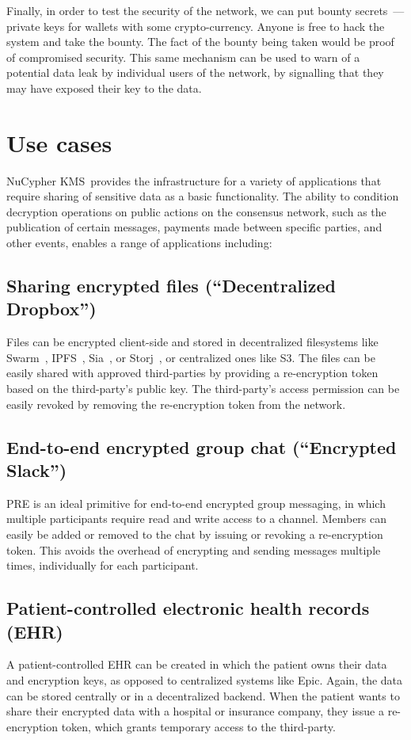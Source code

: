 \documentclass[longbibliography,nofootinbib]{revtex4-1}
\newcommand{\kms}{NuCypher KMS}
\begin{document}
Finally, in order to test the security of the network, we can put bounty secrets~--- private keys for wallets with
some crypto-currency.
Anyone is free to hack the system and take the bounty.
The fact of the bounty being taken would be proof of compromised security.
This same mechanism can be used to warn of a potential data leak by individual users of the network, by signalling that they may have exposed
their key to the data.

\section{Use cases}
\kms~provides the infrastructure for a variety of applications that require sharing of sensitive data as a basic
functionality. The ability to condition decryption operations on public actions on the consensus network, such as the publication
of certain messages, payments made between specific parties, and other events, enables a range of applications including:

\subsection{Sharing encrypted files (``Decentralized Dropbox'')}
\label{sec:files}
Files can be encrypted client-side and stored in decentralized filesystems like Swarm~\cite{swarm}, IPFS~\cite{whitepaper:ipfs}, Sia~\cite{web:sia}, or Storj~\cite{web:storj}, or centralized ones like S3.
The files can be easily shared with approved third-parties by providing a re-encryption token based on the third-party's
public key.
The third-party's access permission can be easily revoked by removing the re-encryption token from the network.

\subsection{End-to-end encrypted group chat (``Encrypted Slack'')}
PRE is an ideal primitive for end-to-end encrypted group messaging, in which multiple participants require read and write
access to a channel. Members can easily be added or removed to the chat by issuing or revoking a re-encryption token.
This avoids the overhead of encrypting and sending messages multiple times, individually for each participant.

\subsection{Patient-controlled electronic health records (EHR)}
A patient-controlled EHR can be created in which the patient owns their data and encryption keys, as opposed to centralized
systems like Epic.
Again, the data can be stored centrally or in a decentralized backend.
When the patient wants to share their encrypted data with a hospital or insurance company, they issue a re-encryption token,
which grants temporary access to the third-party.
\end{document}

